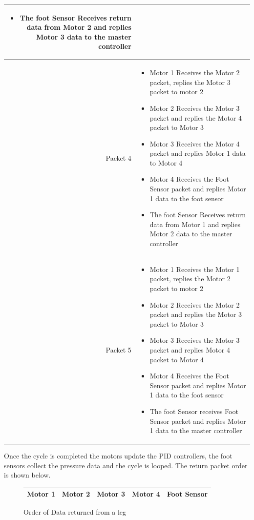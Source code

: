 \begin{longtable}{|r|p{}|}
{\begin{itemize}
                \item The foot Sensor Receives return data from Motor 2 and replies Motor 3 data to the master controller
            \end{itemize}}\\
            \hline
{Packet 4} &  {\begin{itemize}
                \item Motor 1 Receives the Motor 2 packet, replies the Motor 3 packet to motor 2
                \item Motor 2 Receives the Motor 3 packet and replies the Motor 4 packet to Motor 3
                \item Motor 3 Receives the Motor 4 packet and replies Motor 1 data to Motor 4 
                \item Motor 4 Receives the Foot Sensor packet and replies Motor 1 data to the foot sensor 
                \item The foot Sensor Receives return data from Motor 1 and replies Motor 2 data to the master controller
            \end{itemize}}\\
            \hline
{Packet 5} &  {\begin{itemize}
                \item Motor 1 Receives the Motor 1 packet, replies the Motor 2 packet to motor 2
                \item Motor 2 Receives the Motor 2 packet and replies the Motor 3 packet to Motor 3
                \item Motor 3 Receives the Motor 3 packet and replies Motor 4 packet to Motor 4 
                \item Motor 4 Receives the Foot Sensor packet and replies Motor 1 data to the foot sensor 
                \item The foot Sensor receives Foot Sensor packet and replies Motor 1 data to the master controller
            \end{itemize}}\\
\hline
\end{longtable}

\noindent Once the cycle is completed the motors update the PID controllers, the foot sensors collect the pressure data and the cycle is looped. The return packet order is shown below.
\begin{figure}[H]
\centering
\begin{tabular}{|c|c|c|c|c|}
\hline
    Motor 1 & Motor 2 & Motor 3 & Motor 4 & Foot Sensor \\
    \hline
\end{tabular} 
\caption{Order of Data returned from a leg}
\label{fig:DataReturnOrder}
\end{figure}

